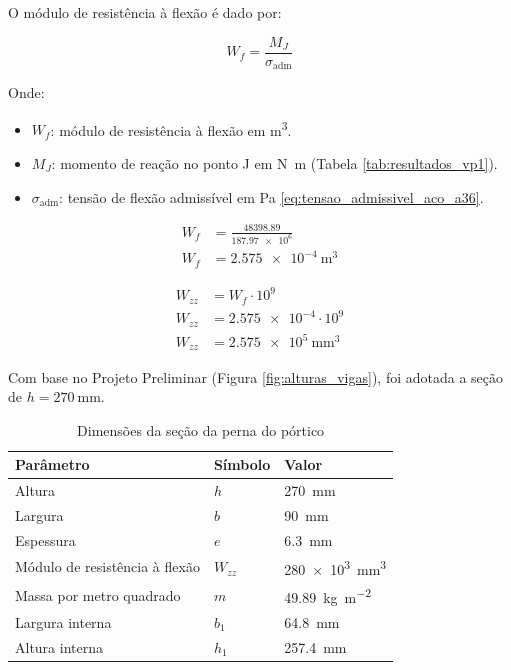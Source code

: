 O módulo de resistência à flexão é dado por:

\begin{equation}
  W_f = \frac{M_J}{\sigma_{\text{adm}}}
  \label{eq:w_f_perna}
\end{equation}

Onde:

\begin{itemize}
  \item $W_f$: módulo de resistência à flexão em \si{\meter^3}.
  \item $M_J$: momento de reação no ponto J em \si{\newton\meter} (Tabela \ref{tab:resultados_vp1}).
  \item $\sigma_{\text{adm}}$: tensão de flexão admissível em \si{\pascal} \eqref{eq:tensao_admissivel_aco_a36}.
\end{itemize}

\vspace{1em}

\begin{align*}
  W_f & = \frac{\num{48398.89}}{\num{187.97e6}} \\
  W_f & = \boxed{\SI{2.575e-4}{\meter^3}}
\end{align*}

\begin{align*}
  W_{zz} & = W_f \cdot 10^9                           \\
  W_{zz} & = \num{2.575e-4} \cdot 10^9                \\
  W_{zz} & = \boxed{\SI{2.575e5}{\milli\meter\cubed}}
\end{align*}

Com base no Projeto Preliminar (Figura \ref{fig:alturas_vigas}), foi adotada a seção de $h = \SI{270}{\milli\meter}$.

\begin{table}[H]
  \centering
  \caption{Dimensões da seção da perna do pórtico}
  \label{tab:dimensoes_perna_portico}
  \begin{tabularx}{\textwidth}{>{\centering\arraybackslash}X>{\centering\arraybackslash}X>{\centering\arraybackslash}X}
    \toprule
    Parâmetro                      & Símbolo  & Valor                              \\
    \midrule
    Altura                         & $h$      & \SI{270}{\milli\meter}             \\
    Largura                        & $b$      & \SI{90}{\milli\meter}              \\
    Espessura                      & $e$      & \SI{6.3}{\milli\meter}             \\
    Módulo de resistência à flexão & $W_{zz}$ & \SI{280e3}{\milli\meter\cubed}     \\
    Massa por metro quadrado       & $m$      & \SI{49.89}{\kilo\gram\per\meter^2} \\
    Largura interna                & $b_1$    & \SI{64.8}{\milli\meter}            \\
    Altura interna                 & $h_1$    & \SI{257.4}{\milli\meter}           \\
    \bottomrule
  \end{tabularx}
\end{table}
